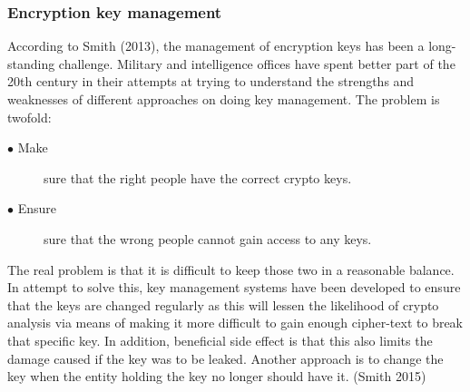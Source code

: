 \documentclass{article}
\begin{document}
\subsubsection{Encryption key management}
According to Smith (2013), the management of encryption keys has been a long-standing challenge. Military and intelligence offices have spent better part of the 20th century in their attempts at trying to understand the strengths and weaknesses of different approaches on doing key management. The problem is twofold:
\begin{description}
	\item[$\bullet$ Make] sure that the right people have the correct crypto keys.
	\item[$\bullet$ Ensure] sure that the wrong people cannot gain access to any keys.
\end{description} 
The real problem is that it is difficult to keep those two in a reasonable balance. In attempt to solve this, key management systems have been developed to ensure that the keys are changed regularly as this will lessen the likelihood of crypto analysis via means of making it more difficult to gain enough cipher-text to break that specific key. In addition, beneficial side effect is that this also limits the damage caused if the key was to be leaked. Another approach is to change the key when the entity holding the key no longer should have it. (Smith 2015) 
\end{document}
